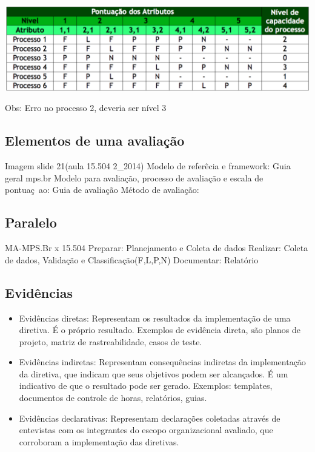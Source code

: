 \documentclass{article}
\begin{document}
	\begin{center}
	\includegraphics[scale=0.37]{exemplo_pontuacao}	
	\end{center}

	Obs: Erro no processo 2, deveria ser nível 3
\subsection{Elementos de uma avaliação}
	Imagem slide 21(aula 15.504 2\_2014)
	Modelo de referêcia e framework: Guia geral mps.br
	Modelo para avaliação, processo de avaliação e escala de pontuaç~ao: Guia de avaliação
	Método de avaliação: 
\subsection{Paralelo}
	MA-MPS.Br x 15.504
	Preparar: Planejamento e Coleta de dados
	Realizar: Coleta de dados, Validação e Classificação(F,L,P,N)
	Documentar: Relatório
\subsection{Evidências}

	\begin{itemize}
	\item Evidências diretas: Representam os resultados da implementação de uma diretiva. É o próprio resultado. Exemplos de evidência direta, são planos de projeto, matriz de rastreabilidade, casos de teste.
	
	\item Evidências indiretas: Representam consequências indiretas da implementação da diretiva, que indicam que seus objetivos podem ser alcançados. É um indicativo de que o resultado pode ser gerado. Exemplos: templates, documentos de controle de horas, relatórios, guias.

	\item Evidências declarativas: Representam declarações coletadas através de entevistas com os integrantes do escopo organizacional avaliado, que corroboram a implementação das diretivas.
	\end{itemize}
\end{document}
